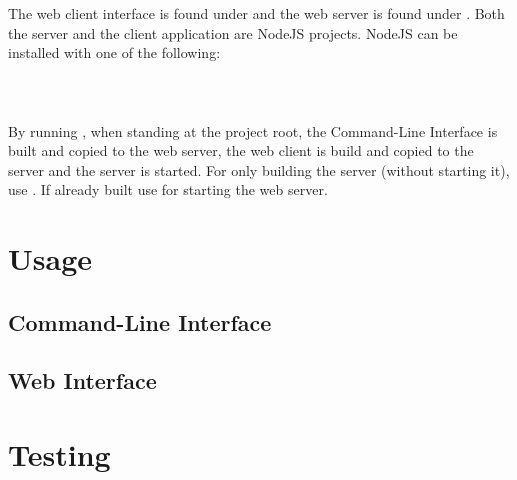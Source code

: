 The web client interface is found under  and the web server is found under .
Both the server and the client application are NodeJS projects. NodeJS can be installed with one of the following:\\
\\
\\
\\

\noindent
By running , when standing at the project root, the Command-Line Interface is built and copied to the web server, the web client is build and copied to the server and the server is started. For only building the server (without starting it), use . If already built use  for starting the web server.

\section*{Usage}
%

\subsection*{Command-Line Interface}
%


\subsection*{Web Interface}
%

\section*{Testing}
